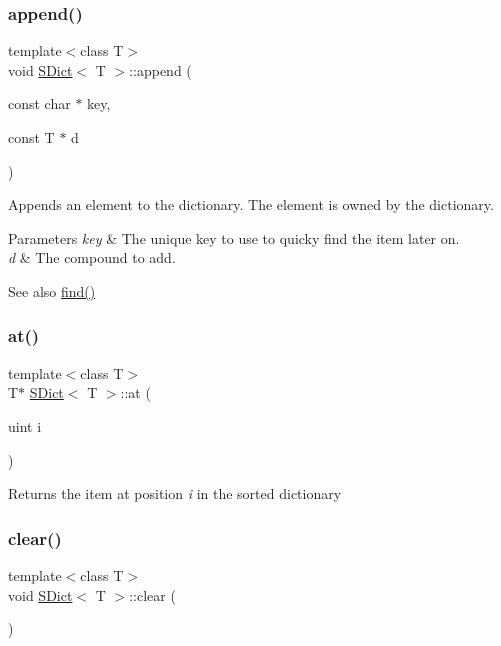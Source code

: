 \subsubsection{\texorpdfstring{append()}{append()}}
{\footnotesize\ttfamily template$<$class T$>$ \\
void \mbox{\hyperlink{class_s_dict}{S\+Dict}}$<$ T $>$\+::append (\begin{DoxyParamCaption}\item[{const char $\ast$}]{key,  }\item[{const T $\ast$}]{d }\end{DoxyParamCaption})\hspace{0.3cm}{\ttfamily [inline]}}

Appends an element to the dictionary. The element is owned by the dictionary. 
\begin{DoxyParams}{Parameters}
{\em key} & The unique key to use to quicky find the item later on. \\
\hline
{\em d} & The compound to add. \\
\hline
\end{DoxyParams}
\begin{DoxySeeAlso}{See also}
\mbox{\hyperlink{class_s_dict_aec67482d780157680d46f48a7ed5e7bd}{find()}} 
\end{DoxySeeAlso}
\mbox{\label{class_s_dict_ab993899004fc3cfc8f00f131e0b6a29d}} 
\subsubsection{\texorpdfstring{at()}{at()}}
{\footnotesize\ttfamily template$<$class T$>$ \\
T$\ast$ \mbox{\hyperlink{class_s_dict}{S\+Dict}}$<$ T $>$\+::at (\begin{DoxyParamCaption}\item[{uint}]{i }\end{DoxyParamCaption})\hspace{0.3cm}{\ttfamily [inline]}}

Returns the item at position {\itshape i} in the sorted dictionary \mbox{\label{class_s_dict_afd6bec6aaf77e2943f42cec1208bc46d}} 
\subsubsection{\texorpdfstring{clear()}{clear()}}
{\footnotesize\ttfamily template$<$class T$>$ \\
void \mbox{\hyperlink{class_s_dict}{S\+Dict}}$<$ T $>$\+::clear (\begin{DoxyParamCaption}{ }\end{DoxyParamCaption})\hspace{0.3cm}{\ttfamily [inline]}}

